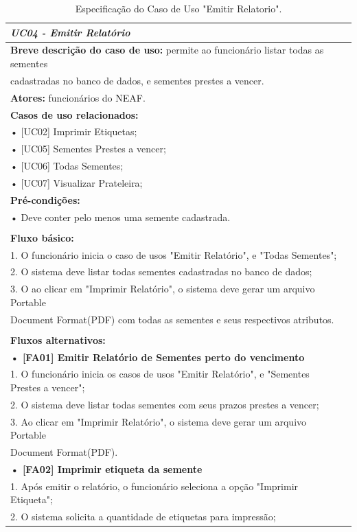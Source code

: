 \documentclass[12pt,a4paper]{article}
\begin{document}
\begin{table}[]
\caption{Especificação do Caso de Uso "Emitir Relatorio".}
\label{tabela:UC4}
\begin{tabular}{|l|c|}
\hline 
{ \it UC04 - Emitir Relatório} \\ 
\hline 
{\bf Breve descrição do caso de uso:} permite ao funcionário listar todas as sementes\\ cadastradas no banco de dados, e sementes prestes a vencer. 
\\
{\bf Atores:} funcionários do NEAF.
\\
{\bf Casos de uso relacionados:}\\
• [UC02] Imprimir Etiquetas;\\
• [UC05] Sementes Prestes a vencer;\\
• [UC06] Todas Sementes;\\
• [UC07] Visualizar Prateleira;
\\
{\bf Pré-condições:}\\
• Deve conter pelo menos uma semente cadastrada.
\\
\\
{\bf Fluxo básico:}\\
1. O funcionário inicia o caso de usos "Emitir Relatório", e "Todas Sementes";\\
2. O sistema deve listar todas sementes cadastradas no banco de dados;\\
3. O ao clicar em "Imprimir Relatório", o sistema deve gerar um arquivo Portable\\ Document Format(PDF)
com todas as sementes e seus respectivos atributos.
\\
\\
{\bf Fluxos alternativos:}\\
{\bf • [FA01] Emitir Relatório de Sementes perto do vencimento}\\
1. O funcionário inicia os casos de usos "Emitir Relatório", e "Sementes Prestes a vencer";\\
2. O sistema deve listar todas sementes com seus prazos prestes a vencer;\\
3. Ao clicar em "Imprimir Relatório", o sistema deve gerar um arquivo Portable\\ 
Document Format(PDF).\\
{\bf • [FA02] Imprimir etiqueta da semente}\\
	1. Após emitir o relatório, o funcionário seleciona a opção "Imprimir Etiqueta";\\
	2. O sistema solicita a quantidade de etiquetas para impressão;\\

\end{tabular}
\end{table}
\end{document}
